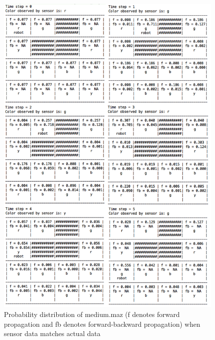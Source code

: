 \documentclass[9.5pt]{extarticle}
\begin{document}
\begin{figure}[H]
\centering
\includegraphics[scale=0.72]{mediumresult2.png}
\caption{Probability distribution of medium.maz (f denotes forward propagation and fb denotes forward-backward propagation) when sensor data matches actual data}
\label{Figure 2}
\end{figure}
\end{document}
